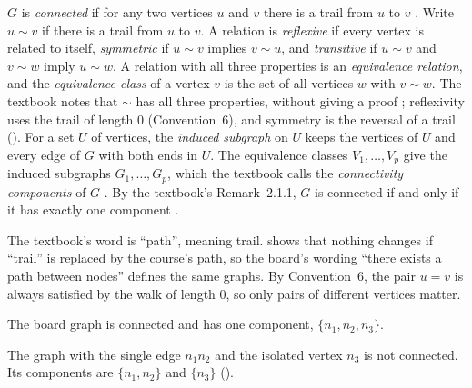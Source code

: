 \begin{definition}\label{def:connected}
$G$ is \emph{connected} if for any two vertices $u$ and $v$ there is a trail from $u$ to $v$ \cite[Def.~2.1.1, p.~48]{petrosyan2015grafneri}. Write $u\sim v$ if there is a trail from $u$ to $v$. A relation is \emph{reflexive} if every vertex is related to itself, \emph{symmetric} if $u\sim v$ implies $v\sim u$, and \emph{transitive} if $u\sim v$ and $v\sim w$ imply $u\sim w$. A relation with all three properties is an \emph{equivalence relation}, and the \emph{equivalence class} of a vertex $v$ is the set of all vertices $w$ with $v\sim w$. The textbook notes that $\sim$ has all three properties, without giving a proof \cite[p.~49]{petrosyan2015grafneri}; reflexivity uses the trail of length $0$ (Convention~6), and symmetry is the reversal of a trail (). For a set $U$ of vertices, the \emph{induced subgraph} on $U$ keeps the vertices of $U$ and every edge of $G$ with both ends in $U$. The equivalence classes $V_1,\dots,V_p$ give the induced subgraphs $G_1,\dots,G_p$, which the textbook calls the \emph{connectivity components} of $G$ \cite[p.~49]{petrosyan2015grafneri}. By the textbook's Remark~2.1.1, $G$ is connected if and only if it has exactly one component \cite[p.~49]{petrosyan2015grafneri}.
\end{definition}
\begin{remark}
The textbook's word is ``path'', meaning trail.  shows that nothing changes if ``trail'' is replaced by the course's path, so the board's wording ``there exists a path between nodes'' defines the same graphs. By Convention~6, the pair $u=v$ is always satisfied by the walk of length $0$, so only pairs of different vertices matter.
\end{remark}
\begin{example}
The board graph is connected and has one component, $\{n_1,n_2,n_3\}$.
\end{example}
\begin{nonexample}
The graph with the single edge $n_1n_2$ and the isolated vertex $n_3$ is not connected. Its components are $\{n_1,n_2\}$ and $\{n_3\}$ ().
\end{nonexample}
